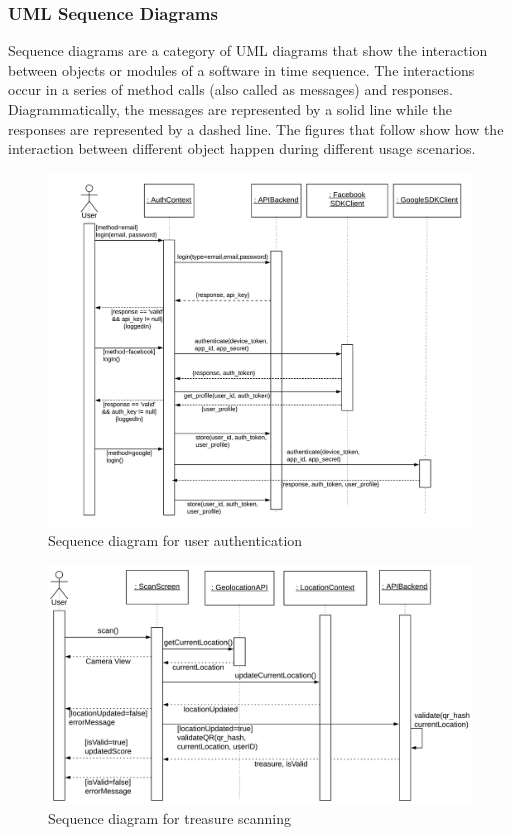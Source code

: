 \documentclass[12pt, a4paper, oneside]{article}
\begin{document}
\subsubsection{UML Sequence Diagrams}
Sequence diagrams are a category of UML diagrams that show the interaction between objects or modules of a software in time sequence. The interactions occur in a series of method calls (also called as messages) and responses. Diagrammatically, the messages are represented by a solid line while the responses are represented by a dashed line. The figures that follow show how the interaction between different object happen during different usage scenarios.

\begin{figure}[H]
\includegraphics[width=\linewidth, keepaspectratio]{sequence-diagrams/login.png}
\centering
\caption{Sequence diagram for user authentication}
\label{fig:auth-sequence}
\end{figure}

\begin{figure}[H]
\includegraphics[width=\linewidth, keepaspectratio]{sequence-diagrams/treasure-scan.png}
\centering
\caption{Sequence diagram for treasure scanning}
\label{fig:treasure-scan-sequence}
\end{figure}
\end{document}
